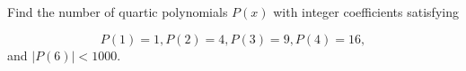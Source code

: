 Find the number of quartic polynomials $P(x)$ with integer coefficients satisfying

$$P(1)=1, P(2)=4,P(3)=9,P(4)=16,$$and $|P(6)|<1000.$
